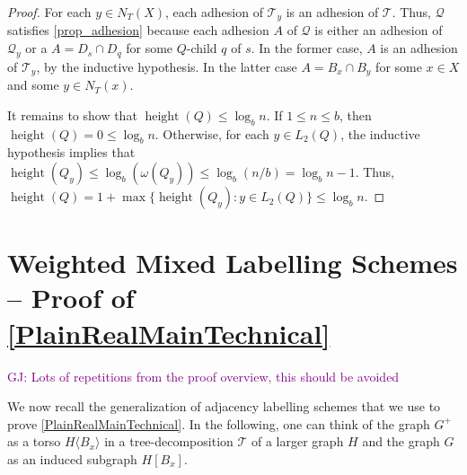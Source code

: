 \documentclass{patmorin}
\renewcommand{\le}{\leqslant}
\newcommand{\gwen}[1]{\noindent\textcolor{Purple}{GJ: #1}}
\newcommand{\torso}[2]{{#1}\langle{#2}\rangle}
\DeclareMathOperator{\height}{height}
\begin{document}
\begin{proof}
    For each $y\in N_T(X)$, each adhesion of $\mathcal{T}_y$ is an adhesion of $\mathcal{T}$.
    Thus, $\mathcal{Q}$ satisfies \ref{prop_adhesion} because each adhesion $A$ of $\mathcal{Q}$ is either an adhesion of $\mathcal{Q}_y$ or a $A=D_s\cap D_{q}$ for some $Q$-child $q$ of $s$.  In the former case, $A$ is an adhesion of $\mathcal{T}_y$, by the inductive hypothesis. In the latter case $A=B_x\cap B_y$ for some $x\in X$ and some $y\in N_T(x)$.





    It remains to show that $\height(Q)\le\log_b n$.  If $1\le n \le b$, then $\height(Q)=0\le\log_b n$.  Otherwise, for each $y\in L_2(Q)$, the inductive hypothesis implies that $\height(Q_y)\le\log_b(\omega(Q_y))\le\log_b(n/b)=\log_b n - 1$.  Thus, $\height(Q)=1+\max\{\height(Q_y):y\in L_2(Q)\}\le \log_b n$.
  \end{proof}



  \section{Weighted Mixed Labelling Schemes -- Proof of \cref{PlainRealMainTechnical}}
  \label{weighted_mixed_section}

\gwen{Lots of repetitions from the proof overview, this should be avoided}

We now recall the generalization of adjacency labelling schemes that we use to prove \cref{PlainRealMainTechnical}.  In the following, one can think of the graph $G^+$ as a torso $\torso{H}{B_x}$ in a tree-decomposition $\mathcal{T}$ of a larger graph $H$ and the graph $G$ as an induced subgraph $H[B_x]$.
\end{document}
